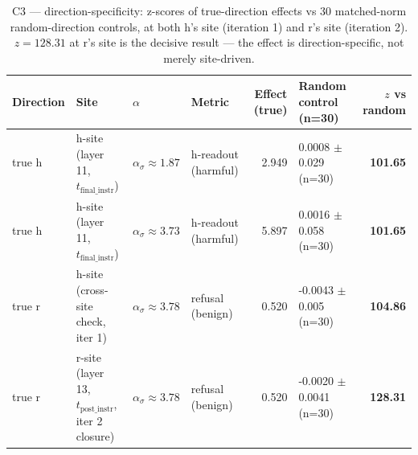 \begin{table}[t]
\centering
\caption{C3 — direction-specificity: z-scores of true-direction effects vs 30 matched-norm random-direction controls, at both h's site (iteration 1) and r's site (iteration 2). $z=128.31$ at r's site is the decisive result — the effect is direction-specific, not merely site-driven.}
\label{tab:c3_specificity}
\begin{tabular}{llllrlr}
\toprule
Direction & Site & $\alpha$ & Metric & Effect (true) & Random control (n=30) & $z$ vs random \\
\midrule
true h & h-site (layer 11, $t_{\text{final\_instr}}$) & $\alpha_\sigma \!\approx\! 1.87$ & h-readout (harmful) & 2.949 & 0.0008 $\pm$ 0.029 (n=30) & \textbf{101.65} \\
true h & h-site (layer 11, $t_{\text{final\_instr}}$) & $\alpha_\sigma \!\approx\! 3.73$ & h-readout (harmful) & 5.897 & 0.0016 $\pm$ 0.058 (n=30) & \textbf{101.65} \\
true r & h-site (cross-site check, iter 1) & $\alpha_\sigma \!\approx\! 3.78$ & refusal (benign) & 0.520 & -0.0043 $\pm$ 0.005 (n=30) & \textbf{104.86} \\
true r & r-site (layer 13, $t_{\text{post\_instr}}$, iter 2 closure) & $\alpha_\sigma \!\approx\! 3.78$ & refusal (benign) & 0.520 & -0.0020 $\pm$ 0.0041 (n=30) & \textbf{128.31} \\
\bottomrule
\end{tabular}
\end{table}

